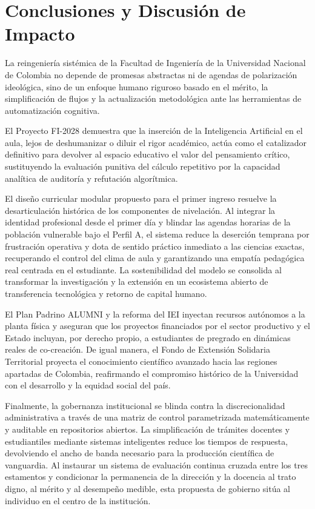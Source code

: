 \documentclass[journal,10pt,twocolumn,letterpaper]{IEEEtran}
\begin{document}
\section{Conclusiones y Discusión de Impacto}
La reingeniería sistémica de la Facultad de Ingeniería de la Universidad Nacional de Colombia no depende de promesas abstractas ni de agendas de polarización ideológica, sino de un enfoque humano riguroso basado en el mérito, la simplificación de flujos y la actualización metodológica ante las herramientas de automatización cognitiva. 

El Proyecto FI-2028 demuestra que la inserción de la Inteligencia Artificial en el aula, lejos de deshumanizar o diluir el rigor académico, actúa como el catalizador definitivo para devolver al espacio educativo el valor del pensamiento crítico, sustituyendo la evaluación punitiva del cálculo repetitivo por la capacidad analítica de auditoría y refutación algorítmica. 

El diseño curricular modular propuesto para el primer ingreso resuelve la desarticulación histórica de los componentes de nivelación. Al integrar la identidad profesional desde el primer día y blindar las agendas horarias de la población vulnerable bajo el Perfil A, el sistema reduce la deserción temprana por frustración operativa y dota de sentido práctico inmediato a las ciencias exactas, recuperando el control del clima de aula y garantizando una empatía pedagógica real centrada en el estudiante. La sostenibilidad del modelo se consolida al transformar la investigación y la extensión en un ecosistema abierto de transferencia tecnológica y retorno de capital humano. 

El Plan Padrino ALUMNI y la reforma del IEI inyectan recursos autónomos a la planta física y aseguran que los proyectos financiados por el sector productivo y el Estado incluyan, por derecho propio, a estudiantes de pregrado en dinámicas reales de co-creación. De igual manera, el Fondo de Extensión Solidaria Territorial proyecta el conocimiento científico avanzado hacia las regiones apartadas de Colombia, reafirmando el compromiso histórico de la Universidad con el desarrollo y la equidad social del país. 

Finalmente, la gobernanza institucional se blinda contra la discrecionalidad administrativa a través de una matriz de control parametrizada matemáticamente y auditable en repositorios abiertos. La simplificación de trámites docentes y estudiantiles mediante sistemas inteligentes reduce los tiempos de respuesta, devolviendo el ancho de banda necesario para la producción científica de vanguardia. Al instaurar un sistema de evaluación continua cruzada entre los tres estamentos y condicionar la permanencia de la dirección y la docencia al trato digno, al mérito y al desempeño medible, esta propuesta de gobierno sitúa al individuo en el centro de la institución. 
\end{document}
